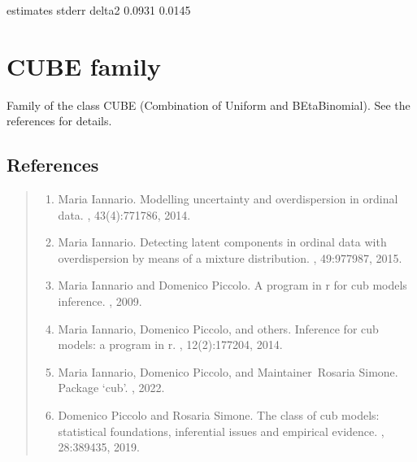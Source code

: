 \documentclass[letterpaper,10pt,english]{sphinxmanual}
\begin{document}
\noindent{}

\begin{sphinxVerbatim}[commandchars=\\\{\}]
     estimates  stderr
delta2  0.0931  0.0145
\end{sphinxVerbatim}


\section{CUBE family}
\label{\detokenize{manual:cube-family}}
\sphinxAtStartPar
Family of the class CUBE (Combination of Uniform and BEtaBinomial).
See the references for details.


\subsection{References}
\label{\detokenize{manual:id158}}\begin{quote}
\begin{enumerate}
%
\setcounter{enumi}{0}
\item {} 
\sphinxAtStartPar
Maria Iannario. Modelling uncertainty and overdispersion in ordinal data. , 43(4):771\textendash{}786, 2014.

\item {} 
\sphinxAtStartPar
Maria Iannario. Detecting latent components in ordinal data with overdispersion by means of a mixture distribution. , 49:977\textendash{}987, 2015.

\item {} 
\sphinxAtStartPar
Maria Iannario and Domenico Piccolo. A program in r for cub models inference. , 2009.

\item {} 
\sphinxAtStartPar
Maria Iannario, Domenico Piccolo, and others. Inference for cub models: a program in r. , 12(2):177\textendash{}204, 2014.

\item {} 
\sphinxAtStartPar
Maria Iannario, Domenico Piccolo, and Maintainer Rosaria Simone. Package ‘cub’. , 2022.

\item {} 
\sphinxAtStartPar
Domenico Piccolo and Rosaria Simone. The class of cub models: statistical foundations, inferential issues and empirical evidence. , 28:389\textendash{}435, 2019.

\end{enumerate}
\end{quote}
\end{document}
